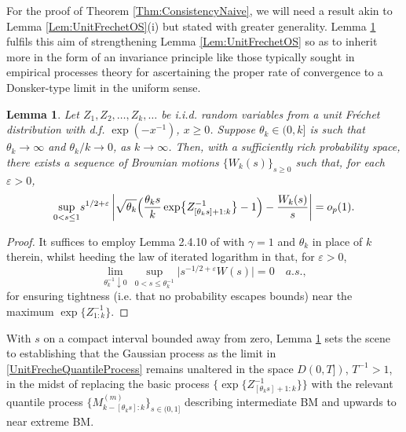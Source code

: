\documentclass[11pt, a4paper, oneside]{article}
\numberwithin{equation}{section}
\theoremstyle{plain}
\newtheorem{lem}[thm]{Lemma}
\theoremstyle{definition}
\newcommand{\suprem}[1]{\ensuremath{\displaystyle {\sup_{#1}}}}
\begin{document}
For the proof of Theorem \ref{Thm:ConsistencyNaive}, we will need a result akin to Lemma \ref{Lem:UnitFrechetOS}(i) but stated with greater generality. Lemma \ref{Lem:UnitFrechetStdProcess} fulfils this aim of strengthening Lemma \ref{Lem:UnitFrechetOS} so as to inherit more in the form of an invariance principle like those typically sought in empirical processes theory for ascertaining the proper rate of convergence to a Donsker-type limit in the uniform sense.
\begin{lem}\label{Lem:UnitFrechetStdProcess}
Let $Z_1, Z_2, \ldots, Z_k, \ldots $ be i.i.d. random variables from a unit Fr\'echet distribution with d.f. $\exp(-x^{-1})$, $ x\geq 0$. Suppose $\theta_k \in (0, k]$ is such that $\theta_k \rightarrow\infty$ and $\theta_k/ k\rightarrow 0$, as $k \rightarrow \infty$. Then, with a sufficiently rich probability space, there exists a sequence of Brownian motions $\bigl\{ W_k(s)\bigr\}_{s \geq 0}$ such that, for each $\varepsilon >0$,
\begin{equation}\label{UnitFrecheQuantileProcess}
    \suprem{0 < s \leq 1} s^{1/2 + \varepsilon} \, \biggl| \sqrt{\theta_k} \Bigl( \frac{\theta_k s}{k} \exp\bigl\{Z^{-1}_{[\theta_k s]+ 1:k}\bigr\} -1 \Bigr) - \frac{W_k(s)}{s}\biggr| = o_p(1).
\end{equation}
\end{lem}
\begin{proof}
    It suffices to employ Lemma 2.4.10 of \citet{deHaanFerreira2006} with $\gamma=1$ and $\theta_k$ in place of $k$ therein, whilst heeding the law of iterated logarithm in that, for $\varepsilon >0$,
    \begin{equation*}
        \lim_{\theta_k^{-1} \downarrow 0}\,  \suprem{0 < s \leq \theta_k^{-1}} \bigl| s^{-1/2 + \varepsilon} W(s)\bigr| = 0 \quad a.s.,
    \end{equation*}
    for ensuring tightness (i.e. that no probability escapes bounds) near the maximum $\exp\{Z^{-1}_{ 1:k}\}$.
\end{proof}

With $s$ on a compact interval bounded away from zero, Lemma \ref{Lem:UnitFrechetStdProcess} sets the scene to establishing that the Gaussian process as the limit in \eqref{UnitFrecheQuantileProcess} remains unaltered in the space $D(0,T])$, $T^{-1} >1$, in the midst of replacing the basic process $\bigl\{\exp\{Z^{-1}_{[\theta_k s]+ 1:k}\}\bigr\}$ with the relevant quantile process $\{M^{(m)}_{k- [\theta_k s]:k}\}_{s \in (0,1]}$ describing intermediate BM and upwards to near extreme BM.\\
\end{document}
